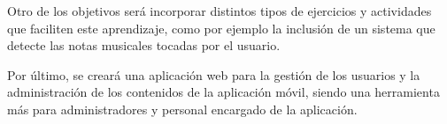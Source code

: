 Otro de los objetivos será incorporar distintos tipos de ejercicios y actividades que faciliten este aprendizaje, como por ejemplo la inclusión de un sistema que detecte las notas musicales
tocadas por el usuario. 

Por último, se creará una aplicación web para la gestión de los usuarios y la administración de los contenidos de la aplicación móvil, siendo una 
herramienta más para administradores y personal encargado de la aplicación.

